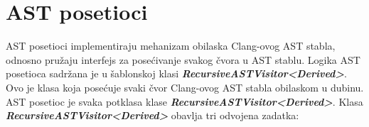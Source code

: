 \documentclass[12pt,oneside]{memoir}
\begin{document}

\newtheorem{primer}{Primer}[section]

\section{AST posetioci}
AST posetioci implementiraju mehanizam obilaska Clang-ovog AST stabla, odnosno pru\v{z}aju interfejs
za pose\'{c}ivanje svakog \v{c}vora u AST stablu.
Logika AST posetioca sadr\v{z}ana je u šablonskoj klasi \textbf{\textit{RecursiveASTVisitor<Derived>}}.
Ovo je klasa koja posećuje svaki čvor Clang-ovog AST stabla obilaskom u dubinu.
AST posetioc je svaka potklasa klase \textbf{\textit{RecursiveASTVisitor<Derived>}}.
Klasa \\ \textbf{\textit{RecursiveASTVisitor<Derived>}} obavlja tri odvojena zadatka:
\end{document}
